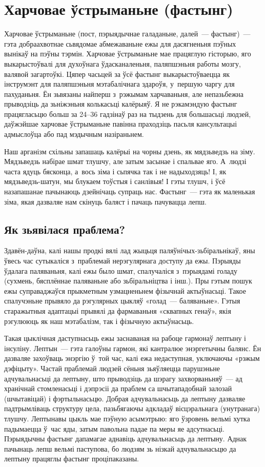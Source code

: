 \chapter{Харчовае ўстрыманьне (фастынг)}

Харчовае ўстрыманьне (пост, пэрыядычнае галаданьне, далей~--- фастынг)~--- гэта добраахвотнае сьвядомае абмежаваньне ежы для дасягненьня пэўных вынікаў на пэўны тэрмін. Харчовае ўстрыманьне мае працяглую гісторыю, яго выкарыстоўвалі для духоўнага ўдасканаленьня, паляпшэньня работы мозгу, валявой загартоўкі. Цяпер часьцей за ўсё фастынг выкарыстоўваецца як інструмэнт для паляпшэньня мэтабалічнага здароўя, у~першую чаргу для пахуданьня. Ён зьвязаны найперш з~рэжымам харчаваньня, але непазьбежна прыводзіць да зьніжэньня колькасьці калёрыяў. Я не рэкамэндую фастынг працягласьцю больш за 24--36 гадзінаў раз на тыдзень для большасьці людзей, даўжэйшае харчовае ўстрыманьне павінна праходзіць пасьля кансультацыі адмыслоўца або пад мэдычным назіраньнем.

Наш арганізм схільны запашаць калёрыі на чорны дзень, як мядзьведзь на зіму. Мядзьведзь набірае шмат тлушчу, але затым засынае і спальвае яго. А~людзі часта ядуць бясконца, а~вось зіма і сьпячка так і не надыходзяць! І, як мядзьведзь-шатун, мы блукаем тоўстыя і санлівыя! І гэты тлушч, і ўсё назапашанае пачынаюць дзейнічаць супраць нас. Фастынг~--- гэта як маленькая зіма, якая дазваляе нам скінуць баляст і пачаць пачувацца лепш.

\section{Як зьявілася праблема?}

Здавён-даўна, калі нашы продкі вялі лад жыцьця паляўнічых-зьбіральнікаў, яны ўвесь час сутыкаліся з~праблемай нерэгулярнага доступу да ежы. Пэрыяды ўдалага паляваньня, калі ежы было шмат, спалучаліся з~пэрыядамі голаду (сухмень, бясплённае паляваньне або зьбіральніцтва і інш.). Пры гэтым пошук ежы суправаджаўся прыкметным узмацненьнем фізычнай актыўнасьці. Такое спалучэньне прывяло да рэгулярных цыкляў «голад~--- баляваньне». Гэтыя старажытныя адаптацыі прывялі да фармаваньня «сквапных генаў», якія рэгулююць як наш мэтабалізм, так і фізычную актыўнасьць.

Такая цыклічная даступнасьць ежы заснаваная на рабоце гармонаў лептыну і інсуліну. Лептын~--- гэта галоўны гармон, які кантралюе энэргетычны балянс. Ён дазваляе захоўваць энэргію ў~той час, калі ежа недаступная, уключаючы «рэжым дэфіцыту». Частай праблемай людзей сёньня зьяўляецца парушэньне адчувальнасьці да лептыну, што прыводзіць да шэрагу захворваньняў~--- ад хранічнай стомленасьці і дэпрэсіі да праблем са шчытападобнай залозай (шчытавіцай) і фэртыльнасьцю. Добрая адчувальнасьць да лептыну дазваляе падтрымліваць структуру цела, пазьбягаючы адкладаў вісцэральнага (унутранага) тлушчу. Лептынавы цыкль мае пэўную асымэтрыю: яго ўзровень вельмі хутка падымаецца ў~час яды, затым павольна падае па меры яе адсутнасьці. Пэрыядычны фастынг дапамагае аднавіць адчувальнасьць да лептыну. Аднак пачынаць лепш вельмі паступова, бо людзям зь нізкай адчувальнасьцю да лептыну працяглы фастынг проціпаказаны.

